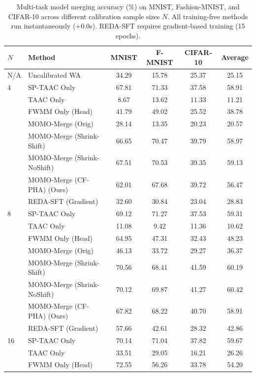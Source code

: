 \documentclass{article}
\theoremstyle{plain}
\theoremstyle{definition}
\theoremstyle{remark}
\begin{document}
\begin{table}[t]
\caption{Multi-task model merging accuracy (\%) on MNIST, Fashion-MNIST, and CIFAR-10 across different calibration sample sizes $N$. All training-free methods run instantaneously (+0.0s). REDA-SFT requires gradient-based training (15 epochs).}
\label{tab:main_results}
\vskip 0.15in
\begin{center}
\begin{small}
\begin{sc}
\begin{tabular}{llcccc}
\toprule
$N$ & Method & MNIST & F-MNIST & CIFAR-10 & Average \\
\midrule
N/A & Uncalibrated WA & 34.29 & 15.78 & 25.37 & 25.15 \\
\midrule
4 & SP-TAAC Only & 67.81 & 71.33 & 37.58 & 58.91 \\
& TAAC Only & 8.67 & 13.62 & 11.33 & 11.21 \\
& FWMM Only (Head) & 41.79 & 49.02 & 25.52 & 38.78 \\
& MOMO-Merge (Orig) & 28.14 & 13.35 & 20.23 & 20.57 \\
& MOMO-Merge (Shrink-Shift) & 66.65 & 70.47 & 39.79 & 58.97 \\
& MOMO-Merge (Shrink-NoShift) & 67.51 & 70.53 & 39.35 & 59.13 \\
& MOMO-Merge (CF-PHA) (Ours) & 62.01 & 67.68 & 39.72 & 56.47 \\
& REDA-SFT (Gradient) & 32.60 & 30.84 & 23.04 & 28.83 \\
\midrule
8 & SP-TAAC Only & 69.12 & 71.27 & 37.53 & 59.31 \\
& TAAC Only & 11.08 & 9.42 & 11.36 & 10.62 \\
& FWMM Only (Head) & 64.95 & 47.31 & 32.43 & 48.23 \\
& MOMO-Merge (Orig) & 46.13 & 33.72 & 29.27 & 36.37 \\
& MOMO-Merge (Shrink-Shift) & 70.56 & 68.41 & 41.59 & 60.19 \\
& MOMO-Merge (Shrink-NoShift) & 70.12 & 69.87 & 41.27 & 60.42 \\
& MOMO-Merge (CF-PHA) (Ours) & 67.82 & 68.22 & 40.70 & 58.91 \\
& REDA-SFT (Gradient) & 57.66 & 42.61 & 28.32 & 42.86 \\
\midrule
16 & SP-TAAC Only & 70.14 & 71.04 & 37.82 & 59.67 \\
& TAAC Only & 33.51 & 29.05 & 16.21 & 26.26 \\
& FWMM Only (Head) & 72.55 & 56.26 & 33.78 & 54.20 \\

\end{tabular}
\end{sc}
\end{small}
\end{center}
\end{table}
\end{document}
